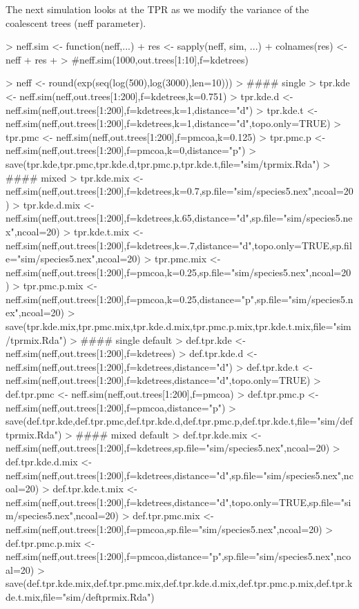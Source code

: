 \documentclass{article}
\begin{document}
The next simulation looks at the TPR as we modify the variance of the
coalescent trees (neff parameter).
\begin{Schunk}
\begin{Sinput}
> neff.sim <- function(neff,...){
+   res <- sapply(neff, sim, ...)
+   colnames(res) <- neff
+   res
+ }
> #neff.sim(1000,out.trees[1:10],f=kdetrees)
\end{Sinput}
\end{Schunk}
\begin{Schunk}
\begin{Sinput}
> neff <- round(exp(seq(log(500),log(3000),len=10)))
> #### single
> tpr.kde <- neff.sim(neff,out.trees[1:200],f=kdetrees,k=0.751)
> tpr.kde.d <- neff.sim(neff,out.trees[1:200],f=kdetrees,k=1,distance="d")
> tpr.kde.t <- neff.sim(neff,out.trees[1:200],f=kdetrees,k=1,distance="d",topo.only=TRUE)
> tpr.pmc <- neff.sim(neff,out.trees[1:200],f=pmcoa,k=0.125)
> tpr.pmc.p <- neff.sim(neff,out.trees[1:200],f=pmcoa,k=0,distance="p")
> save(tpr.kde,tpr.pmc,tpr.kde.d,tpr.pmc.p,tpr.kde.t,file="sim/tprmix.Rda")
> #### mixed
> tpr.kde.mix <- neff.sim(neff,out.trees[1:200],f=kdetrees,k=0.7,sp.file="sim/species5.nex",ncoal=20)
> tpr.kde.d.mix <- neff.sim(neff,out.trees[1:200],f=kdetrees,k.65,distance="d",sp.file="sim/species5.nex",ncoal=20)
> tpr.kde.t.mix <- neff.sim(neff,out.trees[1:200],f=kdetrees,k=.7,distance="d",topo.only=TRUE,sp.file="sim/species5.nex",ncoal=20)
> tpr.pmc.mix <- neff.sim(neff,out.trees[1:200],f=pmcoa,k=0.25,sp.file="sim/species5.nex",ncoal=20)
> tpr.pmc.p.mix <- neff.sim(neff,out.trees[1:200],f=pmcoa,k=0.25,distance="p",sp.file="sim/species5.nex",ncoal=20)
> save(tpr.kde.mix,tpr.pmc.mix,tpr.kde.d.mix,tpr.pmc.p.mix,tpr.kde.t.mix,file="sim/tprmix.Rda")
> #### single default
> def.tpr.kde <- neff.sim(neff,out.trees[1:200],f=kdetrees)
> def.tpr.kde.d <- neff.sim(neff,out.trees[1:200],f=kdetrees,distance="d")
> def.tpr.kde.t <- neff.sim(neff,out.trees[1:200],f=kdetrees,distance="d",topo.only=TRUE)
> def.tpr.pmc <- neff.sim(neff,out.trees[1:200],f=pmcoa)
> def.tpr.pmc.p <- neff.sim(neff,out.trees[1:200],f=pmcoa,distance="p")
> save(def.tpr.kde,def.tpr.pmc,def.tpr.kde.d,def.tpr.pmc.p,def.tpr.kde.t,file="sim/deftprmix.Rda")
> #### mixed default
> def.tpr.kde.mix <- neff.sim(neff,out.trees[1:200],f=kdetrees,sp.file="sim/species5.nex",ncoal=20)
> def.tpr.kde.d.mix <- neff.sim(neff,out.trees[1:200],f=kdetrees,distance="d",sp.file="sim/species5.nex",ncoal=20)
> def.tpr.kde.t.mix <- neff.sim(neff,out.trees[1:200],f=kdetrees,distance="d",topo.only=TRUE,sp.file="sim/species5.nex",ncoal=20)
> def.tpr.pmc.mix <- neff.sim(neff,out.trees[1:200],f=pmcoa,sp.file="sim/species5.nex",ncoal=20)
> def.tpr.pmc.p.mix <- neff.sim(neff,out.trees[1:200],f=pmcoa,distance="p",sp.file="sim/species5.nex",ncoal=20)
> save(def.tpr.kde.mix,def.tpr.pmc.mix,def.tpr.kde.d.mix,def.tpr.pmc.p.mix,def.tpr.kde.t.mix,file="sim/deftprmix.Rda")
\end{Sinput}
\end{Schunk}
\end{document}
